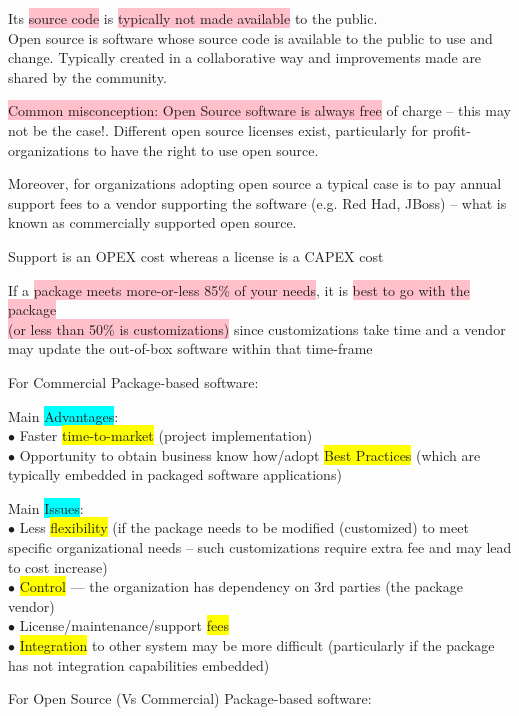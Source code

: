 \documentclass[]{project_plan}
\newcommand{\bulletPoint}{\hspace{-3.1pt}$\bullet$ \hspace{5pt}}
\begin{document}
Its \colorbox{pink}{source code} is \colorbox{pink}{typically not made available} to the public.\\
Open source is software whose source code is available to the public to use and change. Typically
created in a collaborative way and improvements made are shared by the community.

\colorbox{pink}{Common misconception: Open Source software is always free} of charge – this may not be the case!.  Different
open source licenses exist, particularly for profit-organizations to have the right to use open source.

Moreover, for organizations adopting open source a typical case is to pay annual support fees to a
vendor supporting the software (e.g. Red Had, JBoss) – what is known as commercially supported open
source.

Support is an OPEX cost whereas a license is a CAPEX cost

If a \colorbox{pink}{package meets more-or-less 85\% of your needs}, it is
\colorbox{pink}{best to go with the package}\\ \colorbox{pink}{(or less than 50\% is
  customizations)} since customizations take time and a vendor may update
the out-of-box software within that time-frame

For Commercial Package-based software:

Main \colorbox{cyan}{Advantages}:\\
\bulletPoint Faster \colorbox{yellow}{time-to-market} (project implementation)\\
\bulletPoint Opportunity to obtain business know how/adopt \colorbox{yellow}{Best Practices} (which are typically embedded in packaged software applications)

Main \colorbox{cyan}{Issues}:\\
\bulletPoint Less \colorbox{yellow}{flexibility} (if the package needs to be modified (customized) to meet specific organizational needs – such customizations require extra fee and may lead to cost increase)\\
\bulletPoint \colorbox{yellow}{Control} — the organization has dependency on 3rd parties (the package vendor)\\
\bulletPoint License/maintenance/support \colorbox{yellow}{fees}\\
\bulletPoint \colorbox{yellow}{Integration} to other system may be more difficult (particularly if the package has not integration capabilities embedded)

For Open Source (Vs Commercial) Package-based software:
\end{document}

